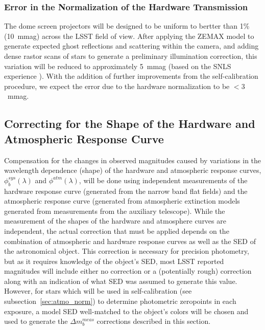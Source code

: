 \documentclass[12pt,preprint]{aastex}
\begin{document}
\subsubsection{Error in the Normalization of the Hardware Transmission}

The dome screen projectors will be designed to be uniform to bertter
than 1\% (10~mmag) across the LSST field of view. After
applying the ZEMAX model to generate expected ghost reflections and
scattering within the camera, and adding dense rastor scans of stars to 
generate a preliminary illumination correction, this variation will be 
reduced to approximately 5~mmag (based on the SNLS experience \citep{Regnault2009}).
With the addition of further improvements from the self-calibration procedure,
we expect the error due to the hardware normalization to be $<3$~mmag. 


\subsection{Correcting for the Shape of the Hardware and Atmospheric
  Response Curve}
\label{sec:phi_correction}

Compensation for the changes in observed magnitudes caused by
variations in the wavelength dependence (shape) of the hardware and
atmospheric response curves, $\phi_b^{sys}(\lambda)$ and
$\phi^{atm}(\lambda)$, will be done using independent measurements of
the hardware response curve (generated from the narrow band flat fields) and the
atmospheric response curve (generated from atmospheric extinction models
generated from measurements from the auxiliary telescope).  While the
measurement of the shapes of the hardware and atmosphere curves are
independent, the actual correction that must be applied depends on the
combination of atmospheric and hardware response curves as well as the
SED of the astronomical object.  This correction is necessary for
precision photometry, but as it requires knowledge of the object's
SED, most LSST reported magnitudes will include either no correction
or a (potentially rough) correction along with an indication of what
SED was assumed to generate this value. However, for stars which will
be used in self-calibration (see subsection~\ref{sec:atmo_norm}) to
determine photometric zeropoints in each exposure, a model SED
well-matched to the object's colors will be chosen and used to
generate the $\Delta m_b^{meas}$ corrections described in this
section.
\end{document}
